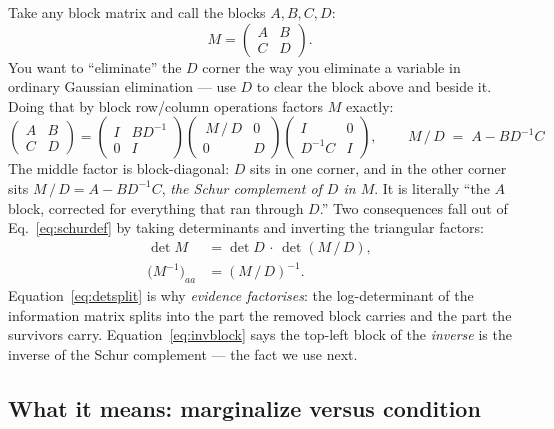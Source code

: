 \documentclass[11pt]{article}
\newcommand{\schur}{\,/\,}
\theoremstyle{definition}
\begin{document}
Take any block matrix and call the blocks $A,B,C,D$:
\begin{equation}
M=\begin{pmatrix}A&B\\ C&D\end{pmatrix}.
\end{equation}
You want to ``eliminate'' the $D$ corner the way you eliminate a variable
in ordinary Gaussian elimination --- use $D$ to clear the block above and
beside it. Doing that by block row/column operations factors $M$ exactly:
\begin{equation}
\begin{pmatrix}A&B\\ C&D\end{pmatrix}
=\begin{pmatrix}I&BD^{-1}\\ 0&I\end{pmatrix}
 \begin{pmatrix}\,M\schur D&0\\ 0&D\end{pmatrix}
 \begin{pmatrix}I&0\\ D^{-1}C&I\end{pmatrix},
\qquad
\boxed{\,M\schur D \;=\; A-BD^{-1}C\,}
\label{eq:schurdef}
\end{equation}
The middle factor is block-diagonal: $D$ sits in one corner, and in the
other corner sits $M\schur D=A-BD^{-1}C$, \emph{the Schur complement of
$D$ in $M$}. It is literally ``the $A$ block, corrected for everything that
ran through $D$.'' Two consequences fall out of Eq.~\eqref{eq:schurdef} by
taking determinants and inverting the triangular factors:
\begin{align}
\det M &= \det D \,\cdot\, \det(M\schur D), \label{eq:detsplit}\\
\big(M^{-1}\big)_{aa} &= (M\schur D)^{-1}. \label{eq:invblock}
\end{align}
Equation~\eqref{eq:detsplit} is why \emph{evidence factorises}: the
log-determinant of the information matrix splits into the part the removed
block carries and the part the survivors carry. Equation~\eqref{eq:invblock}
says the top-left block of the \emph{inverse} is the inverse of the Schur
complement --- the fact we use next.

\subsection{What it means: marginalize versus condition}
\end{document}
